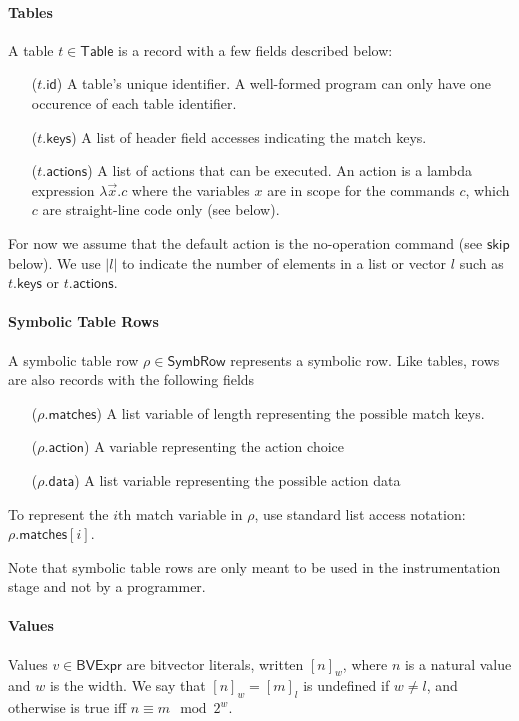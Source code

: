 \documentclass{article}
\newcommand{\BVExpr}{\mathsf{BVExpr}}
\newcommand{\Table}{\mathsf{Table}}
\newcommand{\SymbRow}{\mathsf{SymbRow}}
\newcommand{\matches}{\mathsf{matches}}
\newcommand{\action}{\mathsf{action}}
\newcommand{\actions}{\mathsf{actions}}
\newcommand{\keys}{\mathsf{keys}}
\newcommand{\data}{\mathsf{data}}
\newcommand{\id}{\mathsf{id}}
\newcommand{\SKIP}{\mathsf{skip}}
\begin{document}
\paragraph{Tables}
A table $t \in \Table$ is a record with a few fields described below:
\begin{enumerate}[align=left]
  \item[($t.\id$)] A table's unique identifier. A well-formed program can only have
    one occurence of each table identifier.
  \item[($t.\keys$)] A list of header field accesses indicating the match keys.
  \item[($t.\actions$)] A list of actions that can be executed. An action is a lambda
    expression $\lambda \vec x. c$ where the variables $x$ are in scope for the
    commands $c$, which $c$ are straight-line code only (see below).
\end{enumerate}
For now we assume that the default action is the no-operation command (see
$\SKIP$ below). We use $|l|$ to indicate the number of elements in a list or vector $l$
such as $t.\keys$ or $t.\actions$.


\paragraph{Symbolic Table Rows}
A symbolic table row $\rho \in \SymbRow$ represents a symbolic row. Like tables,
rows are also records with the following fields 
\begin{enumerate}[align=left]
  \item[($\rho.\matches$)] A list variable of length representing the possible match keys.
  \item[($\rho.\action$)] A variable representing the action choice
  \item[($\rho.\data$)] A list variable representing the possible action data
\end{enumerate}

To represent the $i$th match variable in $\rho$, use standard list
access notation: $\rho.\matches[i]$.

Note that symbolic table rows are only meant to be used in the instrumentation
stage and not by a programmer.

\paragraph{Values}
Values $v \in \BVExpr$ are bitvector literals, written $[n]_w$, where $n$
is a natural value and $w$ is the width. We say that $[n]_w = [m]_l$ is
undefined if $w \neq l$, and otherwise is true iff $n \equiv m \mod 2^w$.
\end{document}
